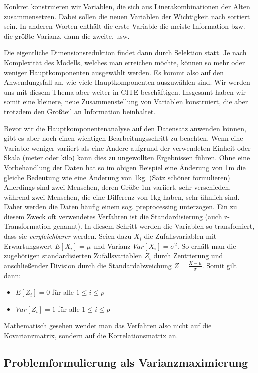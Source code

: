 Konkret konstruieren wir Variablen, die sich aus Linerakombinationen der Alten zusammensetzen. Dabei sollen die neuen Variablen der Wichtigkeit nach sortiert sein. In anderen Worten enthält die erste Variable die meiste Information bzw. die größte Varianz, dann die zweite, usw.

Die eigentliche Dimensionsreduktion findet dann durch Selektion statt. Je nach Komplexität des Modells, welches man erreichen möchte, können so mehr oder weniger Hauptkomponenten ausgewählt werden. Es kommt also auf den Anwendungsfall an, wie viele Hauptkomponenten auszuwählen sind. Wir werden uns mit diesem Thema aber weiter in CITE beschäftigen.
Insgesamt haben wir somit eine kleinere, neue Zusammenstellung von Variablen konstruiert, die aber trotzdem den Großteil an Information beinhaltet.

Bevor wir die Hauptkomponentenanalyse auf den Datensatz anwenden können, gibt es aber noch einen wichtigen Bearbeitungsschritt zu beachten. Wenn eine Variable weniger variiert als eine Andere aufgrund der verwendeten Einheit oder Skala (meter oder kilo) kann dies zu ungewollten Ergebnissen führen. Ohne eine Vorbehandlung der Daten hat so im obigen Beispiel eine Änderung von 1m die gleiche Bedeutung wie eine Änderung von 1kg. (Satz schöner formulieren) Allerdings sind zwei Menschen, deren Größe 1m variiert, sehr verschieden, während zwei Menschen, die eine Differenz von 1kg haben, sehr ähnlich sind. Daher werden die Daten häufig einem sog. preprocessing unterzogen. Ein zu diesem Zweck oft verwendetes Verfahren ist die Standardisierung (auch z-Transformation genannt). In diesem Schritt werden die Variablen so transfomiert, dass sie \textit{vergleichbarer} werden. Seien dazu $X_i$ die Zufallsvariablen mit Erwartungswert $E[X_i] = \mu$ und Varianz $Var[X_i] = \sigma^2$. So erhält man die zugehörigen standardisierten Zufallsvariablen $Z_i$ durch Zentrierung und anschließender Division durch die Standardabweichung $Z = \frac{X-\mu}{\sigma}$. Somit gilt dann:
\begin{itemize}
\item $E[Z_i] = 0$ für alle $1 \leq i \leq p$
\item $Var[Z_i] = 1$ für alle $1 \leq i \leq p$
\end{itemize}

Mathematisch gesehen wendet man das Verfahren also nicht auf die Kovarianzmatrix, sondern auf die Korrelationsmatrix an.

\subsection{Problemformulierung als Varianzmaximierung}


